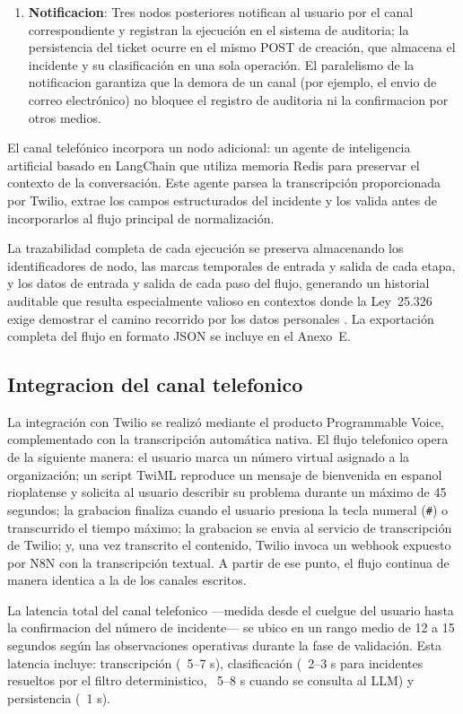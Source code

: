 \begin{enumerate}[leftmargin=*]
  \item \textbf{Notificacion}: Tres nodos posteriores notifican al usuario por el canal correspondiente y registran la ejecución en el sistema de auditoria; la persistencia del ticket ocurre en el mismo POST de creación, que almacena el incidente y su clasificación en una sola operación. El paralelismo de la notificacion garantiza que la demora de un canal (por ejemplo, el envio de correo electrónico) no bloquee el registro de auditoria ni la confirmacion por otros medios.
\end{enumerate}

El canal telefónico incorpora un nodo adicional: un agente de inteligencia artificial basado en LangChain que utiliza memoria Redis para preservar el contexto de la conversación. Este agente parsea la transcripción proporcionada por Twilio, extrae los campos estructurados del incidente y los valida antes de incorporarlos al flujo principal de normalización.

La trazabilidad completa de cada ejecución se preserva almacenando los identificadores de nodo, las marcas temporales de entrada y salida de cada etapa, y los datos de entrada y salida de cada paso del flujo, generando un historial auditable que resulta especialmente valioso en contextos donde la Ley~25.326 exige demostrar el camino recorrido por los datos personales \parencite{Ley25326_2000}. La exportación completa del flujo en formato JSON se incluye en el Anexo~E.

\subsection{Integracion del canal telefonico}

La integración con Twilio se realizó mediante el producto Programmable Voice, complementado con la transcripción automática nativa. El flujo telefonico opera de la siguiente manera: el usuario marca un número virtual asignado a la organización; un script TwiML reproduce un mensaje de bienvenida en espanol rioplatense y solicita al usuario describir su problema durante un máximo de 45 segundos; la grabacion finaliza cuando el usuario presiona la tecla numeral (\texttt{\#}) o transcurrido el tiempo máximo; la grabacion se envia al servicio de transcripción de Twilio; y, una vez transcrito el contenido, Twilio invoca un webhook expuesto por N8N con la transcripción textual. A partir de ese punto, el flujo continua de manera identica a la de los canales escritos.

La latencia total del canal telefonico ---medida desde el cuelgue del usuario hasta la confirmacion del número de incidente--- se ubico en un rango medio de 12 a 15 segundos según las observaciones operativas durante la fase de validación. Esta latencia incluye: transcripción (~5--7 s), clasificación (~2--3 s para incidentes resueltos por el filtro deterministico, ~5--8 s cuando se consulta al LLM) y persistencia (~1 s).

